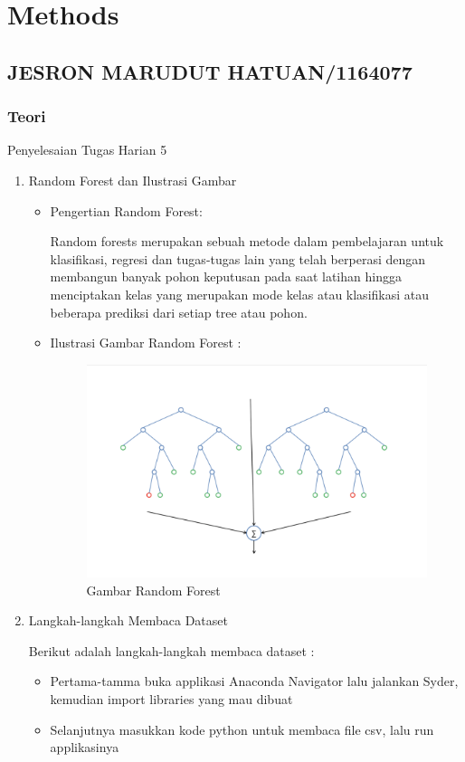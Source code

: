 \chapter{Methods}

\section{JESRON MARUDUT HATUAN/1164077}
\subsection{Teori}
Penyelesaian Tugas Harian 5
\begin{enumerate}
\item Random Forest dan Ilustrasi Gambar
\begin{itemize}
\item Pengertian Random Forest:

Random forests merupakan sebuah metode dalam pembelajaran untuk klasifikasi, regresi dan tugas-tugas lain yang telah berperasi dengan membangun banyak pohon keputusan pada saat latihan hingga menciptakan kelas yang merupakan mode kelas atau klasifikasi atau beberapa prediksi dari setiap tree atau pohon.

\item Ilustrasi Gambar Random Forest :
\begin{figure}[ht]
\centering
\includegraphics[scale=0.5]{figures/c3jesron1.png}
\caption{Gambar Random Forest}
\label{contoh}
\end{figure}
\end{itemize}
\item Langkah-langkah Membaca Dataset

Berikut adalah langkah-langkah membaca dataset :
\begin{itemize}
\item Pertama-tamma buka applikasi Anaconda Navigator lalu jalankan Syder, kemudian import libraries yang mau dibuat
\item Selanjutnya masukkan kode python untuk membaca file csv, lalu run applikasinya


\end{itemize}
\end{enumerate}
